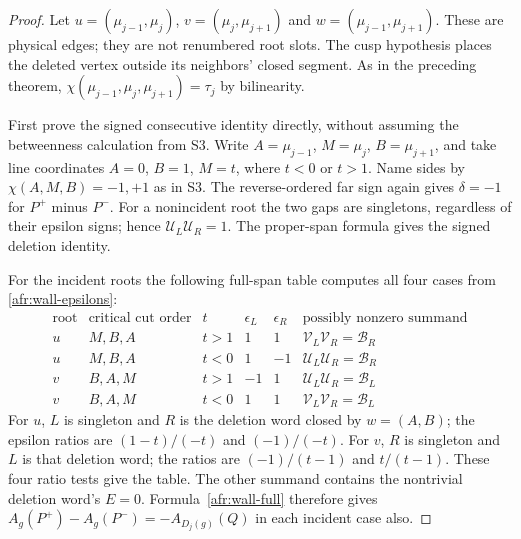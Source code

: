 \begin{proof}\leanok{}
Let $u=(\mu_{j-1},\mu_j)$, $v=(\mu_j,\mu_{j+1})$ and
$w=(\mu_{j-1},\mu_{j+1})$. These are physical edges; they are not
renumbered root slots. The cusp hypothesis places the deleted vertex
outside its neighbors' closed segment. As in the preceding theorem,
$\chi(\mu_{j-1},\mu_j,\mu_{j+1})=\tau_j$ by bilinearity.

First prove the signed consecutive identity directly, without assuming
the betweenness calculation from S3.  Write $A=\mu_{j-1}$, $M=\mu_j$,
$B=\mu_{j+1}$, and take line coordinates $A=0$, $B=1$, $M=t$,
where $t<0$ or $t>1$.  Name sides by $\chi(A,M,B)=-1,+1$ as in
S3.  The reverse-ordered far sign again gives $\delta=-1$ for
$P^+$ minus $P^-$.  For a nonincident root the two gaps are
singletons, regardless of their epsilon signs; hence $\mathcal U_L\mathcal U_R=1$.
The proper-span formula gives the signed deletion identity.

For the incident roots the following full-span table computes all four
cases from \eqref{afr:wall-epsilons}:
\begin{equation}\label{afr:s4-table}
\begin{array}{c|c|c|cc|c}
 \text{root}&\text{critical cut order}&t&
 \epsilon_L&\epsilon_R&
 \text{possibly nonzero summand}\\\hline
 u&M,B,A&t>1&1&1&\mathcal V_L\mathcal V_R=\mathcal B_R\\
 u&M,B,A&t<0&1&-1&\mathcal U_L\mathcal U_R=\mathcal B_R\\
 v&B,A,M&t>1&-1&1&\mathcal U_L\mathcal U_R=\mathcal B_L\\
 v&B,A,M&t<0&1&1&\mathcal V_L\mathcal V_R=\mathcal B_L
\end{array}
\end{equation}
For $u$, $L$ is singleton and $R$ is the deletion word closed by
$w=(A,B)$; the epsilon ratios are $(1-t)/(-t)$ and $(-1)/(-t)$.
For $v$, $R$ is singleton and $L$ is that deletion word; the
ratios are $(-1)/(t-1)$ and $t/(t-1)$.  These four ratio tests give
the table.  The other summand contains the nontrivial deletion
word's $E=0$.  Formula~\eqref{afr:wall-full} therefore gives
$A_g(P^+)-A_g(P^-)=-A_{D_j(g)}(Q)$ in each incident case also.


\end{proof}
